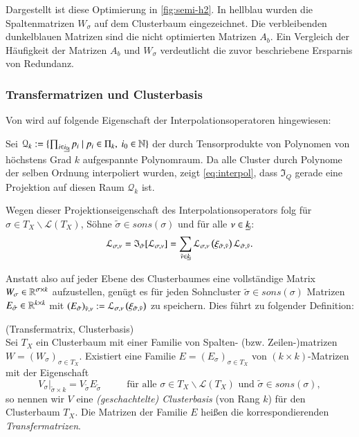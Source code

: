     Dargestellt ist diese Optimierung in \autoref{fig:semi-h2}. In hellblau wurden die Spaltenmatrizen $W_\sigma$ auf dem Clusterbaum eingezeichnet. Die verbleibenden dunkelblauen Matrizen sind
    die nicht optimierten Matrizen $A_b$. Ein Vergleich der Häufigkeit der Matrizen $A_b$ und $W_\sigma$ verdeutlicht die zuvor beschriebene Ersparnis von Redundanz.

    
    \subsubsection{Transfermatrizen und Clusterbasis}
    \label{sec:transmat}
    Von \citet{h2approxint} wird auf folgende Eigenschaft der Interpolationsoperatoren hingewiesen:

    Sei $\mathcal{Q}_k := \{ \prod_{i \in \haken{i_0}} p_i \ | \ p_i \in \Pi_k , \ i_0 \in \N \}$ der durch Tensorprodukte von Polynomen von höchstens Grad $k$ aufgespannte Polynomraum.
    Da alle Cluster durch Polynome der selben Ordnung interpoliert wurden, zeigt \autoref{eq:interpol}, dass $\mathfrak{I}_Q$ gerade eine Projektion auf diesen Raum $\mathcal{Q}_k$ ist.
    
    Wegen dieser Projektionseigenschaft des Interpolationsoperators folg für $\sigma \in T_X \backslash \mathcal{L}\left(T_X\right)$, Söhne $\tilde \sigma \in sons\left(\sigma\right)$ und 
    für alle $\nu \in \haken{k}$:
    \begin{equation*}
      \lag_\inds{\nu} = \mathfrak{I}_{\tilde \sigma}[\lag_\inds{\nu}] = \sum_{\tilde \nu \in \haken{k}} \lag_\inds{\nu}\left(\xi_{\tilde \sigma,\tilde \nu}\right) \lag_{\tilde \sigma,\tilde \nu}.
    \end{equation*}
    
    Anstatt also auf jeder Ebene des Clusterbaumes eine vollständige Matrix $W_\sigma \in \mathbb{R}^{\sigma \times k}$ aufzustellen, genügt es für jeden Sohncluster $\tilde \sigma \in sons\left(\sigma\right)$
    Matrizen $E_{\tilde \sigma} \in \mathbb{R}^{k \times k}$ mit $\left(E_{\tilde \sigma}\right)_{\tilde\nu , \nu} := \mathcal{L}_{\sigma, \nu}\left(\xi_{\tilde \sigma, \tilde \nu}\right)$ zu speichern. Dies führt zu 
    folgender Definition:
    
    \begin{defn}
      (Transfermatrix, Clusterbasis)\\
      Sei $T_X$ ein Clusterbaum mit einer Familie von Spalten- (bzw. Zeilen-)matrizen $W = \left(W_\sigma\right)_{\sigma \in T_X}$. Existiert eine Familie $E = \left(E_\sigma\right)_{\sigma \in T_X}$ 
      von $\left(k \times k\right)$-Matrizen mit der Eigenschaft
      \begin{equation*}
	\left. V_\sigma \right|_{\tilde \sigma \times k} = V_{\tilde \sigma} E_{\tilde \sigma} \ \ \ \ \ \ \ \ \ \ \ \ \text{für alle } 
	\sigma \in T_X \backslash \mathcal{L}\left(T_X\right) \text{ und } \tilde \sigma \in sons\left(\sigma\right),
      \end{equation*}
      so nennen wir $V$ eine \textit{(geschachtelte) Clusterbasis} (von Rang $k$) für den Clusterbaum $T_X$. Die Matrizen der Familie $E$ heißen die korrespondierenden \textit{Transfermatrizen}.
      \citep{nichtlokop}
    \end{defn}

